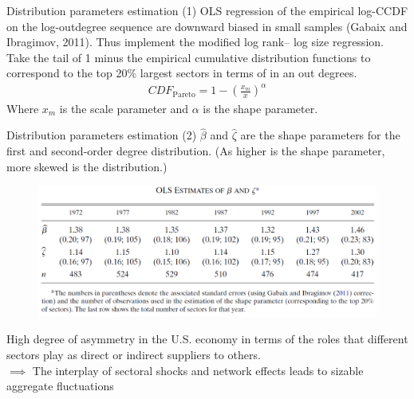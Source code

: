\documentclass{beamer}
\begin{document}
\begin{frame}{Distribution parameters estimation (1)}
    \justifying
    OLS regression of the empirical log-CCDF
    on the log-outdegree sequence are downward biased in small samples (Gabaix and Ibragimov, 2011).
    Thus implement the modified log rank–
    log size regression. Take 
    the tail of  1 minus the empirical
    cumulative distribution functions to correspond to the top 20\%
    largest sectors in terms of in an out degrees.
    \begin{align*}
        CDF_{\text{Pareto}}=1-\left(\frac{x_m}{x}\right)^\alpha
    \end{align*}
    Where $x_m$ is the scale parameter and $\alpha$ is the shape parameter.
\end{frame}
\begin{frame}{Distribution parameters estimation (2)}
    \justifying
    $\hat{\beta}$ and $\hat{\zeta}$ are the shape parameters for the first and 
    second-order degree distribution. (As higher is the shape parameter, more skewed is the distribution.)
    \begin{figure}[H]
        \includegraphics[scale=0.6]{7}
        \centering
\end{figure}  

High degree of asymmetry in the
U.S. economy in terms of the roles that different sectors play as direct or indirect
suppliers to others.\\
$\implies$ The interplay of
sectoral shocks and network effects leads to sizable aggregate fluctuations

\end{frame}
\end{document}

